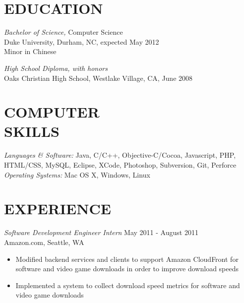 \documentclass[line,margin]{res}
\begin{document}
	\setlength{\pdfpageheight}{\paperheight}
	\setlength{\pdfpagewidth}{\paperwidth}
\address{Duke University, Box 94807, Durham, NC 27708}
\address{alex@galonsky.com \hspace{.93in} REDACTED}

 
\begin{resume}
\section{EDUCATION} {\sl Bachelor of Science,} Computer Science \\
                Duke University, Durham, NC, 
                expected May 2012 \\
				Minor in Chinese

				{\sl High School Diploma, with honors} \\
				Oaks Christian High School, Westlake Village, CA, June 2008
 
 
\section{COMPUTER \\ SKILLS} {\sl Languages \& Software:} Java, C/C++, Objective-C/Cocoa, Javascript, PHP, HTML/CSS, MySQL, Eclipse, XCode, Photoshop, Subversion, Git, Perforce \\
                {\sl Operating Systems:} Mac OS X, Windows, Linux
 
\section{EXPERIENCE} 
				
	{\sl Software Development Engineer Intern} \hfill May 2011 - August 2011 \\
                Amazon.com, Seattle, WA
                 \begin{itemize}  \itemsep -2pt %
                 \item Modified backend services and clients to support Amazon CloudFront for software and video game downloads in order to improve download speeds
		 		 \item Implemented a system to collect download speed metrics for software and video game downloads
                \end{itemize}
				

\end{resume}
\end{document}
